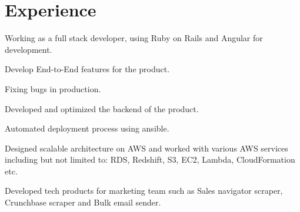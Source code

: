 \documentclass[]{main}
\begin{document}
%
%

%
%

%
%

\begin{minipage}[t]{0.60\textwidth}


\section{Experience}
\vspace{\topsep} %
\begin{tightemize}
\item Working as a full stack developer, using Ruby on Rails and Angular for development.
\item Develop End-to-End features for the product.
\item Fixing bugs in production.
\end{tightemize}
\sectionsep

\begin{tightemize}
\item Developed and optimized the backend of the product.
\item Automated deployment process using ansible.
\item Designed scalable architecture on AWS and worked with various AWS services including but not limited
to: RDS, Redshift, S3, EC2, Lambda, CloudFormation etc.
\item Developed tech products for marketing team such as Sales navigator scraper, Crunchbase scraper and Bulk email sender.
\end{tightemize}
\sectionsep


\end{minipage}
\end{document}
